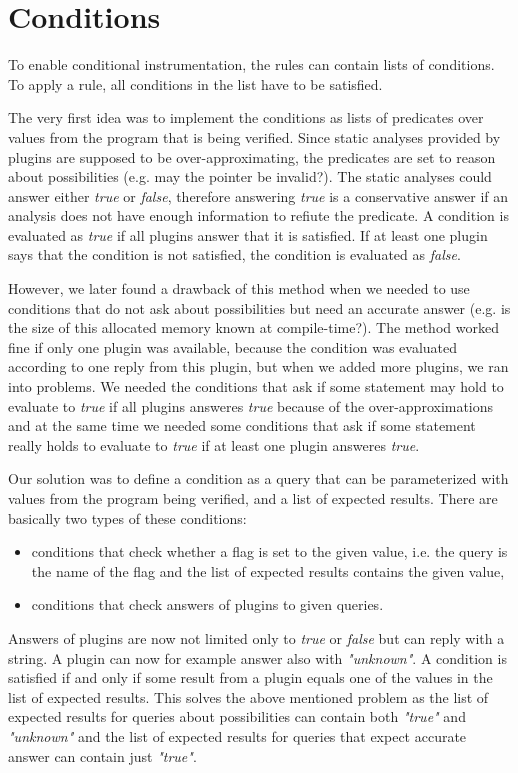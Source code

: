 \section{Conditions}\label{sec:conditions}

To enable conditional instrumentation, the rules can contain lists of
conditions. To apply a rule, all conditions in the list have to be satisfied.

The very first idea was to implement the conditions as lists of predicates over
values from the program that is being verified. Since static analyses provided
by plugins are supposed to be over-approximating, the predicates are set to
reason about possibilities (e.g. may the pointer be invalid?). The static
analyses could answer either \emph{true} or \emph{false}, therefore answering
\emph{true} is a conservative answer if an analysis does not have enough
information to refiute the predicate. A condition is evaluated as \emph{true}
if all plugins answer that it is satisfied. If at least one plugin says that
the condition is not satisfied, the condition is evaluated as \emph{false}.

However, we later found a drawback of this method when we needed to use
conditions that do not ask about possibilities but need an accurate answer
(e.g. is the size of this allocated memory known at compile-time?). The method
worked fine if only one plugin was available, because the condition was
evaluated according to one reply from this plugin, but when we added more
plugins, we ran into problems. We needed the conditions that ask if some
statement may hold to evaluate to \emph{true} if all plugins answeres
\emph{true} because of the over-approximations and at the same time we needed
some conditions that ask if some statement really holds to evaluate to
\emph{true} if at least one plugin answeres \emph{true}.

Our solution was to define a condition as a query that can be parameterized
with values from the program being verified, and a list of expected results.
There are basically two types of these conditions:
\begin{itemize}
 \item conditions that check whether a flag is set to the given value, i.e. the
 query is the name of the flag and the list of expected results contains the
 given value,
 \item conditions that check answers of plugins to given queries.
\end{itemize}
Answers of plugins are now not limited only to \emph{true} or \emph{false} but
can reply with a string. A plugin can now for example answer also with
\emph{"unknown"}. A condition is satisfied if and only if some result from a
plugin equals one of the values in the list of expected results. This solves
the above mentioned problem as the list of expected results for queries about
possibilities can contain both \emph{"true"} and \emph{"unknown"} and the list
of expected results for queries that expect accurate answer can contain just
\emph{"true"}.

